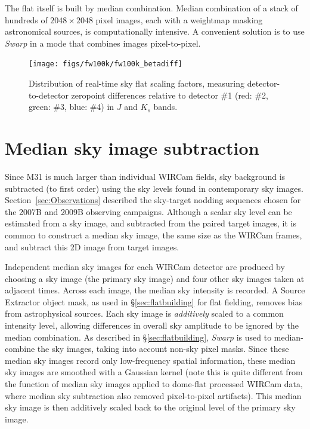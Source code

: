 \documentclass[iop]{emulateapj}
\newcommand{\sw}[1]{\textit{#1}} %
\newcommand{\Sec}[1]{\S\ref{sec:#1}}  %
\begin{document}
The flat itself is built by median combination.
Median combination of a stack of hundreds of $2048\times2048$ pixel images, each with a weightmap masking astronomical sources, is computationally intensive.
A convenient solution is to use \sw{Swarp} \citep[an image-mosaicing software package,][]{Bertin:2002} in a mode that combines images pixel-to-pixel.

\begin{figure}[t]
\centering
\texttt{[image: figs/fw100k/fw100k\_betadiff]}
\caption{Distribution of real-time sky flat scaling factors, measuring detector-to-detector zeropoint differences relative to detector \#1 (red: \#2, green: \#3, blue: \#4) in $J$ and $K_s$ bands.
}
\label{fig:fw100k_zpdiff}
\end{figure}

\section{Median sky image subtraction}
\label{sec:mediansky}

Since M31 is much larger than individual WIRCam fields, sky background is subtracted (to first order) using the sky levels found in contemporary sky images.
Section~\ref{sec:Observations} described the sky-target nodding sequences chosen for the 2007B and 2009B observing campaigns. 
Although a scalar sky level can be estimated from a sky image, and subtracted from the paired target images, it is common to construct a median sky image, the same size as the WIRCam frames, and subtract this 2D image from target images.

Independent median sky images for each WIRCam detector are produced by choosing a sky image (the primary sky image) and four other sky images taken at adjacent times.
Across each image, the median sky intensity is recorded.
A Source Extractor object mask, as used in \Sec{flatbuilding} for flat fielding, removes bias from astrophysical sources.
Each sky image is \emph{additively} scaled to a common intensity level, allowing differences in overall sky amplitude to be ignored by the median combination.
As described in \Sec{flatbuilding}, \sw{Swarp} is used to median-combine the sky images, taking into account non-sky pixel masks.
Since these median sky images record only low-frequency spatial information, these median sky images are smoothed with a Gaussian kernel (note this is quite different from the function of median sky images applied to dome-flat processed WIRCam data, where median sky subtraction also removed pixel-to-pixel artifacts).
This median sky image is then additively scaled back to the original level of the primary sky image.
\end{document}
